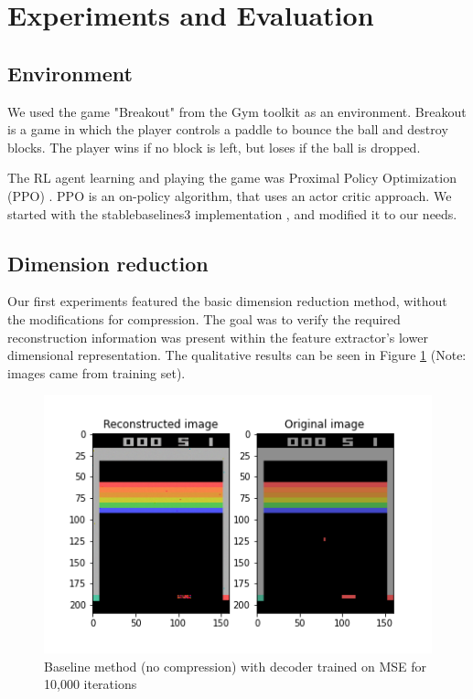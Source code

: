 \section{Experiments and Evaluation}
\subsection{Environment}
We used the game "Breakout" from the Gym toolkit \cite{brockman2016openai} as an
environment. Breakout is a game in which the player controls a paddle to bounce the ball and destroy blocks. The player wins if no block is left, but loses if the ball is dropped.

The RL agent learning and playing the game was Proximal
Policy Optimization (PPO) \cite{raffin2019stable}. PPO is an on-policy
algorithm, that uses an actor critic approach. We started with the stablebaselines3 implementation \cite{raffin2019stable}, and
modified it to our needs.

\subsection{Dimension reduction}
Our first experiments featured the basic dimension reduction method,
without the modifications for compression. The goal was to verify the
required reconstruction information was present within the feature extractor's lower dimensional
representation. The qualitative results can be
seen in Figure \ref{fig:baseline_MSE} (Note: images came
from training set). \\

\begin{figure}[H]
    \centering
    \includegraphics[width=\linewidth]{images/orig_reconstructed0.0.png}
    \caption{Baseline method (no compression) with decoder trained on MSE for 10,000 iterations}
    \label{fig:baseline_MSE}
\end{figure}


